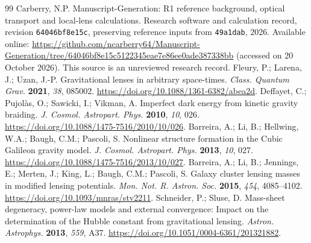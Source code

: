 \documentclass[galaxies,article,submit,oneauthor]{Definitions/mdpi}
\begin{document}
\pagestyle{plain}
\renewcommand*{\theHequation}{\thesection.\arabic{equation}}

\begin{thebibliography}{99}
Carberry, N.P. Manuscript-Generation: R1 reference background, optical
transport and local-lens calculations. Research software and calculation
record, revision \texttt{64046bf8e15c}, preserving reference inputs from
\texttt{49a1dab}, 2026.
Available online:
\url{https://github.com/ncarberry64/Manuscript-Generation/tree/64046bf8e15c5122345eae7e86ee0ade387338bb}
(accessed on 20 October 2026). This source is an unreviewed research record.
Fleury, P.; Larena, J.; Uzan, J.-P.
Gravitational lenses in arbitrary space-times.
\emph{Class. Quantum Grav.} \textbf{2021}, \emph{38}, 085002.
\href{https://doi.org/10.1088/1361-6382/abea2d}{https://doi.org/10.1088/1361-6382/abea2d}.
Deffayet, C.; Pujol\`as, O.; Sawicki, I.; Vikman, A.
Imperfect dark energy from kinetic gravity braiding.
\emph{J. Cosmol. Astropart. Phys.} \textbf{2010}, \emph{10}, 026.
\href{https://doi.org/10.1088/1475-7516/2010/10/026}{https://doi.org/10.1088/1475-7516/2010/10/026}.
Barreira, A.; Li, B.; Hellwing, W.A.; Baugh, C.M.; Pascoli, S.
Nonlinear structure formation in the Cubic Galileon gravity model.
\emph{J. Cosmol. Astropart. Phys.} \textbf{2013}, \emph{10}, 027.
\href{https://doi.org/10.1088/1475-7516/2013/10/027}{https://doi.org/10.1088/1475-7516/2013/10/027}.
Barreira, A.; Li, B.; Jennings, E.; Merten, J.; King, L.; Baugh, C.M.; Pascoli, S.
Galaxy cluster lensing masses in modified lensing potentials.
\emph{Mon. Not. R. Astron. Soc.} \textbf{2015}, \emph{454}, 4085--4102.
\href{https://doi.org/10.1093/mnras/stv2211}{https://doi.org/10.1093/mnras/stv2211}.
Schneider, P.; Sluse, D.
Mass-sheet degeneracy, power-law models and external convergence:
Impact on the determination of the Hubble constant from gravitational lensing.
\emph{Astron. Astrophys.} \textbf{2013}, \emph{559}, A37.
\href{https://doi.org/10.1051/0004-6361/201321882}{https://doi.org/10.1051/0004-6361/201321882}.

\end{thebibliography}
\end{document}
